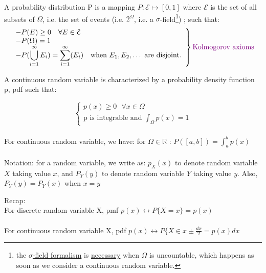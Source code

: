 \documentclass[12pt]{report}
\def\R{\mathbb{R}}
\newcommand{\defobj}[1]{\color{red}#1\color{black}{}}
\newcommand{\defmean}[1]{\color{green!70!black}#1\color{black}{}}
\renewcommand{\emph}[1]{\color{violet}#1\color{black}{}}
\newcommand{\sigmaField}{\mathcal{E}}
\begin{document}
A \defobj{probability distribution} \emph{P} is a \defmean{mapping $P: \sigmaField\mapsto[0,1]$} where $\sigmaField$ is the set of all subsets of $\Omega$, i.e. the set of \emph{events} (i.e. $2^{\Omega}$,
i.e. a $\sigma$-field\footnote{the \href{https://en.wikipedia.org/wiki/Sigma-algebra}{$\sigma$-field formalism} is \href{http://math.stackexchange.com/a/683941/44171}{necessary} when $\Omega$ is uncountable, which happens as soon as we consider a continuous random variable.}) ;
such that:
\defmean{
  \begin{displaymath}
    \left.
  \begin{array}{ll}
    - P(E) \ge 0 \quad \forall E \in \sigmaField\\
    - P(\Omega) = 1\\
    - P(\displaystyle\bigcup_{i=1}^{\infty} E_{i}) = \sum_{i=1}^{\infty}(E_{i}) \quad \text{when $E_1, E_2, \dots$ are disjoint.}
    \end{array}
  \right\} \emph{\text{Kolmogorov axioms}}
  \end{displaymath}
}

A continuous random variable is characterized by a \defobj{probability density function} \emph{p, pdf} such that:

\[ \left\{\begin{array}{ll}
p(x) \ge 0 \text{ } \forall x \in \Omega\\
\text{p is integrable and } \displaystyle\int_{\Omega} p(x) = 1
\end{array}\right.\]
\\
For continuous random variable, we have: for $\Omega \in \R$ : $ P([a, b]) = \displaystyle\int_{a}^{b} p(x) $ \\ \\

Notation: for a random variable, we write as: $p_X(x)$ to denote random variable $X$ taking value $x$, and $P_Y(y)$ to denote random variable $Y$ taking value $y$. Also, $P_Y(y) = P_Y(x)$ when $x=y$


\newpage

Recap: \\

\hspace For discrete random variable X, pmf $p(x) \leftrightarrow  P\{X = x\} = p(x) $ \\ \\
\hspace*{5mm} For continuous random variable X, pdf $p(x) \leftrightarrow P\{ X \in x \pm \frac{dx}{2} = p(x) dx $  \\
\end{document}
